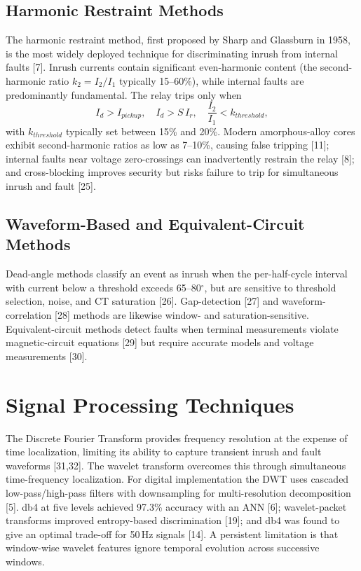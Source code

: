 \documentclass[12pt,a4paper,oneside]{report}
\begin{document}
\subsection{Harmonic Restraint Methods}
The harmonic restraint method, first proposed by Sharp and Glassburn in 1958, is the most widely deployed technique for discriminating inrush from internal faults [7]. Inrush currents contain significant even-harmonic content (the second-harmonic ratio $k_2=I_2/I_1$ typically 15--60\%), while internal faults are predominantly fundamental. The relay trips only when
\begin{equation}
I_d>I_{pickup},\quad I_d>S\,I_r,\quad \frac{I_2}{I_1}<k_{threshold},
\end{equation}
with $k_{threshold}$ typically set between 15\% and 20\%. Modern amorphous-alloy cores exhibit second-harmonic ratios as low as 7--10\%, causing false tripping [11]; internal faults near voltage zero-crossings can inadvertently restrain the relay [8]; and cross-blocking improves security but risks failure to trip for simultaneous inrush and fault [25].
\subsection{Waveform-Based and Equivalent-Circuit Methods}
Dead-angle methods classify an event as inrush when the per-half-cycle interval with current below a threshold exceeds 65--80$^\circ$, but are sensitive to threshold selection, noise, and CT saturation [26]. Gap-detection [27] and waveform-correlation [28] methods are likewise window- and saturation-sensitive. Equivalent-circuit methods detect faults when terminal measurements violate magnetic-circuit equations [29] but require accurate models and voltage measurements [30].

\section{Signal Processing Techniques}
The Discrete Fourier Transform provides frequency resolution at the expense of time localization, limiting its ability to capture transient inrush and fault waveforms [31,32]. The wavelet transform overcomes this through simultaneous time-frequency localization. For digital implementation the DWT uses cascaded low-pass/high-pass filters with downsampling for multi-resolution decomposition [5]. db4 at five levels achieved 97.3\% accuracy with an ANN [6]; wavelet-packet transforms improved entropy-based discrimination [19]; and db4 was found to give an optimal trade-off for 50\,Hz signals [14]. A persistent limitation is that window-wise wavelet features ignore temporal evolution across successive windows.
\end{document}
